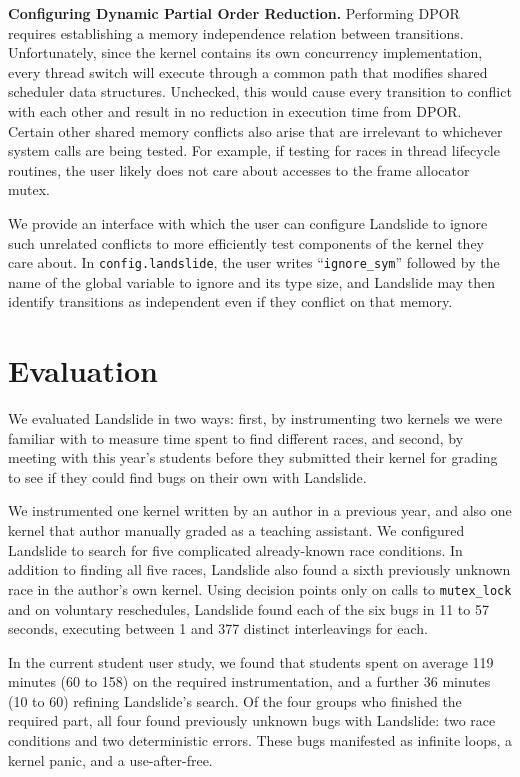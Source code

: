 \documentclass{llncs}
\begin{document}
{\bf Configuring Dynamic Partial Order Reduction.} Performing DPOR \cite{dpor} requires establishing a memory independence relation between transitions.
Unfortunately, since the kernel contains its own concurrency implementation, every thread switch will execute through a common path that modifies shared scheduler data structures.
Unchecked, this would cause every transition to conflict with each other and result in no reduction in execution time from DPOR.
Certain other shared memory conflicts also arise that are irrelevant to whichever system calls are being tested. For example, if testing for races in thread lifecycle routines, the user likely does not care about accesses to the frame allocator mutex.

We provide an interface with which the user can configure Landslide to ignore such unrelated conflicts to more efficiently test components of the kernel they care about. In \texttt{config.landslide}, the user writes ``\texttt{ignore\_sym}'' followed by the name of the global variable to ignore and its type size, and Landslide may then identify transitions as independent even if they conflict on that memory.

\section{Evaluation}

We evaluated Landslide in two ways: first, by instrumenting two kernels we were familiar with to measure time spent to find different races, and second, by meeting with this year's students before they submitted their kernel for grading to see if they could find bugs on their own with Landslide.

We instrumented one kernel written by an author in a previous year, and also one kernel that author manually graded as a teaching assistant. We configured Landslide to search for five complicated already-known race conditions. In addition to finding all five races, Landslide also found a sixth previously unknown race in the author's own kernel. Using decision points only on calls to \texttt{mutex\_lock} and on voluntary reschedules, Landslide found each of the six bugs in 11 to 57 seconds, executing between 1 and 377 distinct interleavings for each.

In the current student user study, we found that students spent on average 119 minutes (60 to 158) on the required instrumentation, and a further 36 minutes (10 to 60) refining Landslide's search. Of the four groups who finished the required part, all four found previously unknown bugs with Landslide: two race conditions and two deterministic errors. These bugs manifested as infinite loops, a kernel panic, and a use-after-free.
\end{document}
